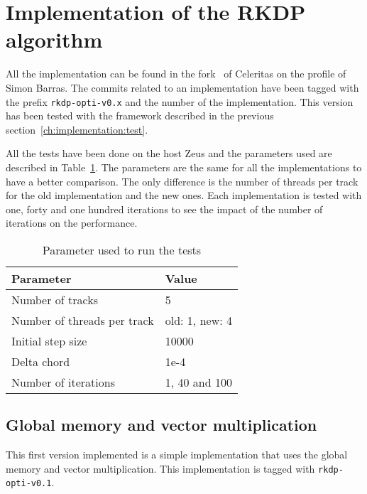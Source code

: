 \section{Implementation of the RKDP algorithm}
\label{ch:implementation:rkdp}

All the implementation can be found in the fork~\cite{fork-celeritas} of
Celeritas on the profile of Simon Barras.
The commits related to an implementation have been tagged with the prefix
\texttt{rkdp-opti-v0.x} and the number of the implementation.
This version has been tested with the framework described in the previous
section~\ref{ch:implementation:test}.

All the tests have been done on the host Zeus and the parameters used are
described in Table~\ref{tab:implementation:rkdp:parameters}.
The parameters are the same for all the implementations to have a better
comparison.
The only difference is the number of threads per track for the old implementation
and the new ones.
Each implementation is tested with one, forty and one hundred iterations to see
the impact of the number of iterations on the performance.


\begin{table}[ht]
    \centering
    \begin{tabular}{|l|l|}
        \hline
        \textbf{Parameter} & \textbf{Value} \\
        \hline
        Number of tracks & 5 \\
        \hline
        Number of threads per track & old: 1, new: 4 \\
        \hline
        Initial step size & 10000 \\
        \hline
        Delta chord & 1e-4 \\
        \hline
        Number of iterations & 1, 40 and 100 \\
        \hline
    \end{tabular}
    \caption{Parameter used to run the tests}
    \label{tab:implementation:rkdp:parameters}
\end{table}

\subsection{Global memory and vector multiplication}
\label{ch:implementation:rkdp:global-vecmult}

This first version implemented is a simple implementation that uses the global
memory and vector multiplication.
This implementation is tagged with \texttt{rkdp-opti-v0.1}.

